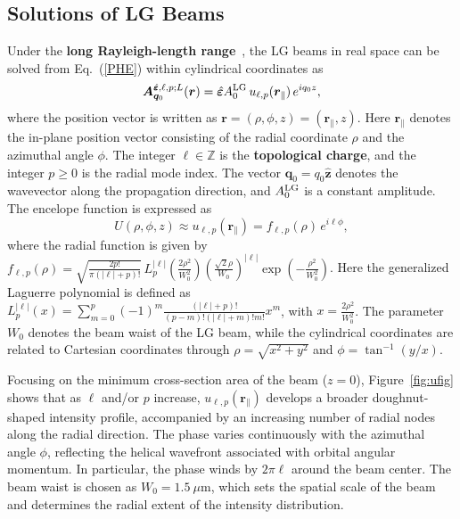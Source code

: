 \subsection{Solutions of LG Beams}
Under the \textbf{long Rayleigh-length range}~\cite{romero2002quantum}, the LG beams in real space can be solved from Eq.~(\ref{PHE}) within cylindrical coordinates as
\begin{equation}
\boldsymbol{A}^{\hat{\boldsymbol{\varepsilon}}, \ell, p; L}_{\boldsymbol{q}_0}(\boldsymbol{r})
=
\hat{\boldsymbol{\varepsilon}} A^{\rm LG}_0
\, u_{\ell, p}(\boldsymbol{r}_\parallel)
\, e^{i q_0 z},
\label{LGbeam}
\end{equation}
where the position vector is written as $\boldsymbol{r}=(\rho,\phi,z)=(\boldsymbol{r}_\parallel,z)$. Here $\boldsymbol{r}_\parallel$ denotes the in-plane position vector consisting of the radial coordinate $\rho$ and the azimuthal angle $\phi$. The integer $\ell\in\mathbb{Z}$ is the \textbf{topological charge}, and the integer $p\ge0$ is the radial mode index. The vector $\boldsymbol{q}_0 = q_0 \hat{\boldsymbol{z}}$ denotes the wavevector along the propagation direction, and $A^{\rm LG}_0$ is a constant amplitude. The encelope function is expressed as
\begin{equation}
U(\rho,\phi,z)\approx u_{\ell, p}(\boldsymbol{r}_\parallel)
=
f_{\ell, p}(\rho)\,e^{i\ell\phi},
\end{equation}
where the radial function is given by~\cite{romero2002quantum, peng2022tailoring, sanchez2024enhanced} $f_{\ell, p}(\rho)
=
\sqrt{\frac{2p!}{\pi(|\ell|+p)!}}
\,
L_p^{|\ell|}
\left(
\frac{2\rho^2}{W_0^2}
\right)
\left(
\frac{\sqrt{2}\rho}{W_0}
\right)^{|\ell|}
\exp\left(
-\frac{\rho^2}{W_0^2}
\right)$. Here the generalized Laguerre polynomial is defined as $L_p^{|\ell|}(x)
=
\sum_{m=0}^{p}
(-1)^m
\frac{(|\ell|+p)!}{(p-m)!(|\ell|+m)!m!}
x^m$, with $x=\frac{2\rho^2}{W_0^2}$. The parameter $W_0$ denotes the beam waist of the LG beam, while the cylindrical coordinates are related to Cartesian coordinates through $\rho=\sqrt{x^2+y^2}$ and $\phi=\tan^{-1}(y/x)$.

Focusing on the minimum cross-section area of the beam ($z=0$), Figure~\ref{fig:ufig} shows that as $\ell$ and/or $p$ increase, $u_{\ell, p}(\boldsymbol{r}_\parallel)$ develops a broader doughnut-shaped intensity profile, accompanied by an increasing number of radial nodes along the radial direction. The phase varies continuously with the azimuthal angle $\phi$, reflecting the helical wavefront associated with orbital angular momentum. In particular, the phase winds by $2\pi \ell$ around the beam center. The beam waist is chosen as $W_0 = 1.5~\mu\mathrm{m}$, which sets the spatial scale of the beam and determines the radial extent of the intensity distribution.

